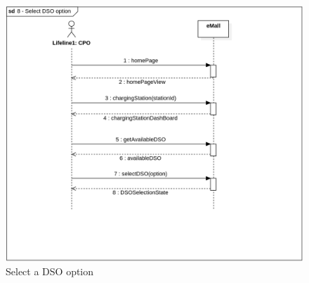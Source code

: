 \begin{figure}[H]
    \begin{center}
        \includegraphics[width=\textwidth]{img/sequence/dso.png}
        \caption{Select a DSO option}
    \end{center}
\end{figure}
\newpage
